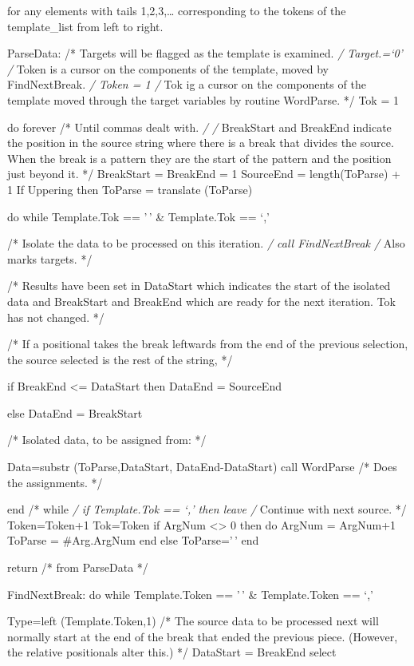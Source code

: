 for any elements with tails 1,2,3,\ldots{} corresponding to the tokens
of the template\_list from left to right.

ParseData: /* Targets will be flagged as the template is examined.
\emph{/ Target.=`0' /} Token is a cursor on the components of the
template, moved by FindNextBreak. \emph{/ Token = 1 /} Tok ig a cursor
on the components of the template moved through the target variables by
routine WordParse. */ Tok = 1

do forever /* Until commas dealt with. \emph{/ /} BreakStart and
BreakEnd indicate the position in the source string where there is a
break that divides the source. When the break is a pattern they are the
start of the pattern and the position just beyond it. */ BreakStart =
BreakEnd = 1 SourceEnd = length(ToParse) + 1 If Uppering then ToParse =
translate (ToParse)

do while Template.Tok == '\,' \& Template.Tok == `,'

/* Isolate the data to be processed on this iteration. \emph{/ call
FindNextBreak /} Also marks targets. */

/* Results have been set in DataStart which indicates the start of the
isolated data and BreakStart and BreakEnd which are ready for the next
iteration. Tok has not changed. */

/* If a positional takes the break leftwards from the end of the
previous selection, the source selected is the rest of the string, */

if BreakEnd \textless= DataStart then DataEnd = SourceEnd

else DataEnd = BreakStart

/* Isolated data, to be assigned from: */

Data=substr (ToParse,DataStart, DataEnd-DataStart) call WordParse /*
Does the assignments. */

end /* while \emph{/ if Template.Tok == `,' then leave /} Continue with
next source. */ Token=Token+1 Tok=Token if ArgNum
\textless\textgreater{} 0 then do ArgNum = ArgNum+1 ToParse =
\#Arg.ArgNum end else ToParse='\,' end

return /* from ParseData */

FindNextBreak: do while Template.Token == '\,' \& Template.Token == `,'

Type=left (Template.Token,1) /* The source data to be processed next
will normally start at the end of the break that ended the previous
piece. (However, the relative positionals alter this.) */ DataStart =
BreakEnd select

